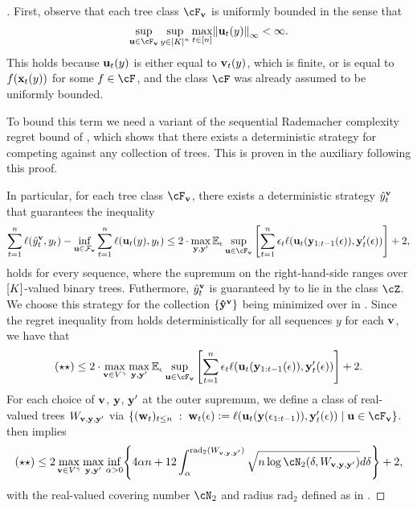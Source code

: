 \begin{proof}[]
First, observe that each tree class $\cF_{\vv}$ is uniformly bounded in the sense that \[\sup_{\uu\in\cF_{\vv}}\sup_{y\in\brk*{K}^{n}}\max_{t\in\brk*{n}}\nrm*{\uu_{t}(y)}_{\infty}<\infty.\] This holds because $\uu_{t}(y)$ is either equal to $\vv_{t}(y)$, which is finite, or is equal to $f(\x_{t}(y))$ for some $f\in\cF$, and the class $\cF$ was already assumed to be uniformly bounded.

To bound this term we need a variant of the sequential Rademacher complexity regret bound of \citep{RakSriTew10}, which shows that there exists a deterministic strategy for competing against any collection of trees. This is proven in the auxiliary  following this proof.

In particular, for each tree class $\cF_{\vv}$, there exists a deterministic strategy $\hat{y}_{t}^{\vv}$ that guarantees the inequality
\[
  \sum_{t=1}^n \ell(\hat{y}^{\vv}_{t},y_t) -  \inf_{\uu \in \mathcal{F}_\vv} \sum_{t=1}^n \ell(\uu_t(y),y_t) \leq
  2\cdot\max_{\y,\y'}\Enn_{\eps}\sup_{\uu\in{}\cF_{\vv}}\left[ \sum_{t=1}^n \eps_{t}\ell(\uu_{t}(\y_{1:t-1}(\eps)),\y'_t(\eps))\right] + 2,
 \]
 holds for every sequence, where the supremum on the right-hand-side ranges over $\brk*{K}$-valued binary trees. Futhermore, $\yh_{t}^{\vv}$ is guaranteed by  to lie in the class $\cZ$. We choose this strategy for the collection $\crl*{\yhtree^{\vv}}$ being minimized over in . Since the regret inequality from  holds deterministically for all sequences $y$ for each $\vv$, we have that
 \[
   (\star\star) \leq{} 2\cdot\max_{\vv\in{}V^{\gamma}}\max_{\y,\y'}\Enn_{\eps}\sup_{\uu\in{}\cF_{\vv}}\left[ \sum_{t=1}^n \eps_{t}\ell(\uu_{t}(\y_{1:t-1}(\eps)),\y'_t(\eps))\right] + 2.
 \]
 For each choice of $\vv$, $\y$, $\y'$ at the outer supremum, we define a class of real-valued trees $W_{\vv, \y, \y'}$  via  $\crl*{(\ww_{t})_{t\leq{}n}\;:\;\ww_{t}(\eps) \ldef \ls(\uu_{t}(\y(\eps_{1:t-1})), \y'_{t}(\eps)) \mid{} \uu\in\cF_{\vv}}$.  then implies
 \[
   (\star\star) \leq{} 2\max_{\vv\in{}V^{\gamma}}\max_{\y,\y'}\inf_{\alpha>0}\crl*{
      4\alpha{}n + 12\int_{\alpha}^{\mathrm{rad}_{2}(W_{\vv,\y,\y'})}\sqrt{n\log\cN_{2}(\delta, W_{\vv,\y,\y'})}d\delta
    } + 2,
 \]
 with the real-valued covering number $\cN_{2}$ and radius $\mathrm{rad}_{2}$ defined as in .


\end{proof}
